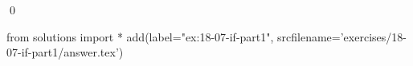
\begin{ex}
  \label{ex:18-07-if-part1}
  
  \qed
\end{ex}
\begin{python0}
from solutions import *
add(label="ex:18-07-if-part1",
    srcfilename='exercises/18-07-if-part1/answer.tex')
\end{python0}

